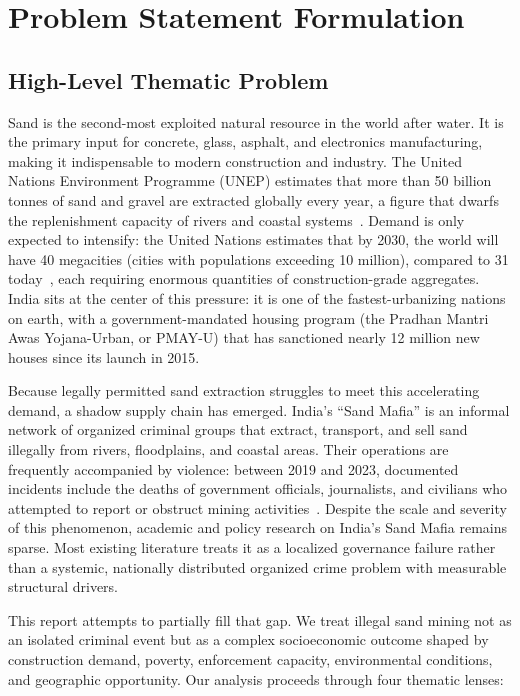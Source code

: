 \documentclass[12pt]{article}
\begin{document}
\tableofcontents
\newpage

\section{Problem Statement Formulation}

\subsection{High-Level Thematic Problem}

Sand is the second-most exploited natural resource in the world after water. It is the primary input for concrete, glass, asphalt, and electronics manufacturing, making it indispensable to modern construction and industry. The United Nations Environment Programme (UNEP) estimates that more than 50 billion tonnes of sand and gravel are extracted globally every year, a figure that dwarfs the replenishment capacity of rivers and coastal systems~\cite{sand_unep}. Demand is only expected to intensify: the United Nations estimates that by 2030, the world will have 40 megacities (cities with populations exceeding 10 million), compared to 31 today~\cite{sand_pop}, each requiring enormous quantities of construction-grade aggregates. India sits at the center of this pressure: it is one of the fastest-urbanizing nations on earth, with a government-mandated housing program (the Pradhan Mantri Awas Yojana-Urban, or PMAY-U) that has sanctioned nearly 12 million new houses since its launch in 2015.

Because legally permitted sand extraction struggles to meet this accelerating demand, a shadow supply chain has emerged. India's ``Sand Mafia'' is an informal network of organized criminal groups that extract, transport, and sell sand illegally from rivers, floodplains, and coastal areas. Their operations are frequently accompanied by violence: between 2019 and 2023, documented incidents include the deaths of government officials, journalists, and civilians who attempted to report or obstruct mining activities~\cite{sandwatch_court}. Despite the scale and severity of this phenomenon, academic and policy research on India's Sand Mafia remains sparse. Most existing literature treats it as a localized governance failure rather than a systemic, nationally distributed organized crime problem with measurable structural drivers.

This report attempts to partially fill that gap. We treat illegal sand mining not as an isolated criminal event but as a complex socioeconomic outcome shaped by construction demand, poverty, enforcement capacity, environmental conditions, and geographic opportunity. Our analysis proceeds through four thematic lenses:
\end{document}
